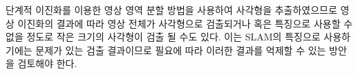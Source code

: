 \documentclass[master,korean,final]{cbnu-ecs}
\begin{document}
단계적 이진화를 이용한 영상 영역 분할 방법을 사용하여 사각형을 추출하였으므로 영상 이진화의 결과에 따라 영상 전체가 사각형으로 검출되거나 혹은 특징으로 사용할 수 없을 정도로 작은 크기의 사각형이 검출 될 수도 있다. 이는 SLAM의 특징으로 사용하기에는 문제가 있는 검출 결과이므로 필요에 따라 이러한 결과를 억제할 수 있는 방안을 검토해야 한다.
\end{document}
